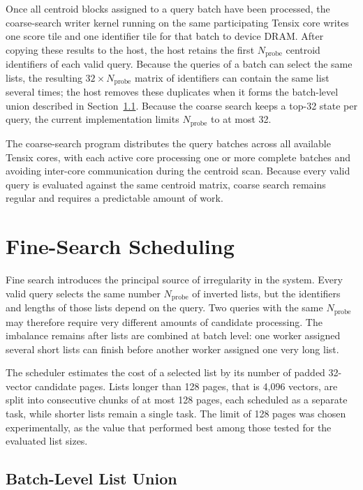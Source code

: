 Once all centroid blocks assigned to a query batch have been processed, the coarse-search writer kernel running on the same participating Tensix core writes one score tile and one identifier tile for that batch to device DRAM. After copying these results to the host, the host retains the first \(N_{\mathrm{probe}}\) centroid identifiers of each valid query. Because the queries of a batch can select the same lists, the resulting \(32\times N_{\mathrm{probe}}\) matrix of identifiers can contain the same list several times; the host removes these duplicates when it forms the batch-level union described in Section~\ref{subsec:batch-level-union}. Because the coarse search keeps a top-32 state per query, the current implementation limits \(N_{\mathrm{probe}}\) to at most 32.

The coarse-search program distributes the query batches across all available Tensix cores, with each active core processing one or more complete batches and avoiding inter-core communication during the centroid scan. Because every valid query is evaluated against the same centroid matrix, coarse search remains regular and requires a predictable amount of work.

\section{Fine-Search Scheduling}
\label{sec:fine-search-scheduling}

Fine search introduces the principal source of irregularity in the system. Every valid query selects the same number \(N_{\mathrm{probe}}\) of inverted lists, but the identifiers and lengths of those lists depend on the query. Two queries with the same \(N_{\mathrm{probe}}\) may therefore require very different amounts of candidate processing. The imbalance remains after lists are combined at batch level: one worker assigned several short lists can finish before another worker assigned one very long list.

The scheduler estimates the cost of a selected list by its number of padded 32-vector candidate pages. Lists longer than 128 pages, that is 4,096 vectors, are split into consecutive chunks of at most 128 pages, each scheduled as a separate task, while shorter lists remain a single task. The limit of 128 pages was chosen experimentally, as the value that performed best among those tested for the evaluated list sizes.

\subsection{Batch-Level List Union}
\label{subsec:batch-level-union}


